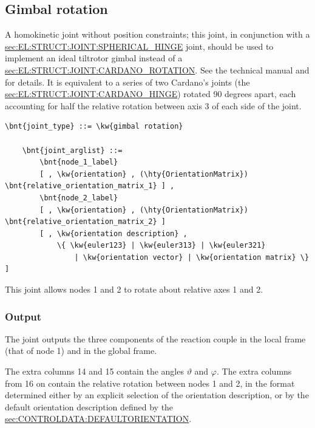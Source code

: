 \subsection{Gimbal rotation}\label{sec:EL:JOINT:GIMBALROTATION}
A homokinetic joint without position constraints;
this joint, in conjunction with a
\hyperref{\kw{spherical hinge}}{\kw{spherical hinge} (see Section~}{)}{sec:EL:STRUCT:JOINT:SPHERICAL_HINGE}
joint, should be used to implement an ideal tiltrotor gimbal
instead of a
\hyperref{\kw{cardano rotation}}{\kw{cardano rotation} (see Section~}{)}{sec:EL:STRUCT:JOINT:CARDANO_ROTATION}.
See the technical manual and \cite{GIMBAL-2008} for details.
It is equivalent to a series of two Cardano's joints
(the \hyperref{\kw{cardano hinge}}{\kw{cardano hinge}, see Section~}{}{sec:EL:STRUCT:JOINT:CARDANO_HINGE})
rotated 90 degrees apart, each accounting for half the relative rotation
between axis 3 of each side of the joint.
\begin{Verbatim}[commandchars=\\\{\}]
    \bnt{joint_type} ::= \kw{gimbal rotation}

    \bnt{joint_arglist} ::= 
        \bnt{node_1_label}
        [ , \kw{orientation} , (\hty{OrientationMatrix}) \bnt{relative_orientation_matrix_1} ] ,
        \bnt{node_2_label}
        [ , \kw{orientation} , (\hty{OrientationMatrix}) \bnt{relative_orientation_matrix_2} ]
        [ , \kw{orientation description} ,
            \{ \kw{euler123} | \kw{euler313} | \kw{euler321}
                | \kw{orientation vector} | \kw{orientation matrix} \} ]
\end{Verbatim}
This joint allows nodes 1 and 2 to rotate about relative axes 1 and 2.

\subsubsection{Output}
The  joint outputs the three components
of the reaction couple in the local frame (that of node 1) 
and in the global frame.

The extra columns 14 and 15 contain the angles $\vartheta$ and $\varphi$.
The extra columns from 16 on contain the relative rotation
between nodes 1 and 2, in the format determined either by an explicit
selection of the orientation description, or by the default
orientation description defined by the 
\hyperref{\kw{default orientation} keyword}{\kw{default orientation} keyword (see Section~}{)}{sec:CONTROLDATA:DEFAULTORIENTATION}.

